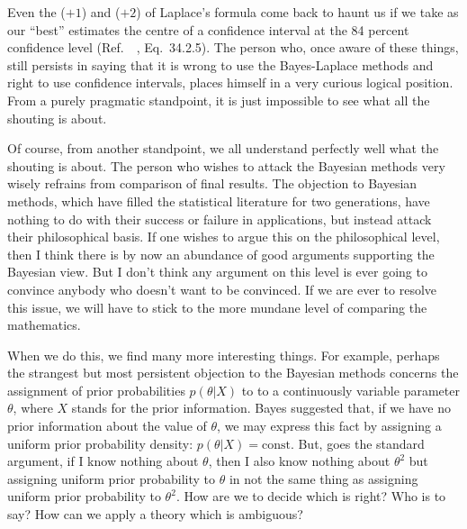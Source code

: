 \documentclass[12pt]{article}
\let\oldcite\cite
\renewcommand{\cite}{~\oldcite}
\begin{document}
Even the ($+1$) and ($+2$) of Laplace's formula come back to haunt us if we take as our ``best'' estimates the centre of a confidence interval at the 84 percent confidence level (Ref.~\cite{cramer}, Eq.~34.2.5). The person who, once aware of these things, still persists in saying that it is wrong to use the Bayes-Laplace methods and right to use confidence intervals, places himself in a very curious logical position. From a purely pragmatic standpoint, it is just impossible to see what all the shouting is about.

Of course, from another standpoint, we all understand perfectly well what the shouting is about. The person who wishes to attack the Bayesian methods very wisely refrains from comparison of final results. The objection to Bayesian methods, which have filled the statistical literature for two generations, have nothing to do with their success or failure in applications, but instead attack their philosophical basis. If one wishes to argue this on the philosophical level, then I think there is by now an abundance of good arguments supporting the Bayesian view. But I don't think any argument on this level is ever
going to convince anybody who doesn't want to be convinced. If we are
ever to resolve this issue, we will have to stick to the more mundane level of comparing the mathematics.

When we do this, we find many more interesting things. For
example, perhaps the strangest but most persistent objection to the
Bayesian methods concerns the assignment of prior probabilities $p(\theta|X)$ to
to a continuously variable parameter $\theta$, where $X$ stands for the prior
information. Bayes suggested that, if we have no prior information
about the value of $\theta$, we may express this fact by assigning a uniform
prior probability density: $p(\theta|X) = \text{const.}$ But, goes the standard
argument, if I know nothing about $\theta$, then I also know nothing about $\theta^2$
but assigning uniform prior probability to $\theta$ in not the same thing as
assigning uniform prior probability to $\theta^2$. How are we to decide which
is right? Who is to say? How can we apply a theory which is ambiguous?
\end{document}

